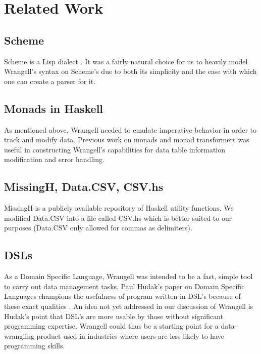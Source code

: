 \documentclass[preprint,nocopyrightspace]{sig-alternate}
\begin{document}
\begin{comment}
\subsection{Other Functionality of Wrangell}
.............()....more discussion of what Wrangell can do?...........()...................
\end{comment}

\section{Related Work}

\subsection{Scheme}
Scheme is a Lisp dialect \cite{scheme}. It was a fairly natural choice for us to heavily model Wrangell's syntax on Scheme's due to both its simplicity and the ease with which one can create a parser for it.

\subsection{Monads in Haskell}
As mentioned above, Wrangell needed to emulate imperative behavior in order to track and modify data. Previous work on monads and monad transformers \citep{monadTransform} was useful in constructing Wrangell's capabilities for data table information modification and error handling. 

\subsection{MissingH, Data.CSV, CSV.hs}
MissingH \cite{dataCSV} is a publicly available repository of Haskell utility functions. We modified Data.CSV into a file called CSV.hs which is better suited to our purposes (Data.CSV only allowed for commas as delimiters).

\subsection{DSLs}
As a Domain Specific Language, Wrangell was intended to be a fast, simple tool to carry out data management tasks. Paul Hudak's paper on Domain Specific Languages champions the usefulness of program written in DSL's because of these exact qualities \cite{DSLs}. An idea not yet addressed in our discussion of Wrangell is Hudak's point that DSL's are more usable by those without significant programming expertise. Wrangell could thus be a starting point for a data-wrangling product used in industries where users are less likely to have programming skills. 
\end{document}
